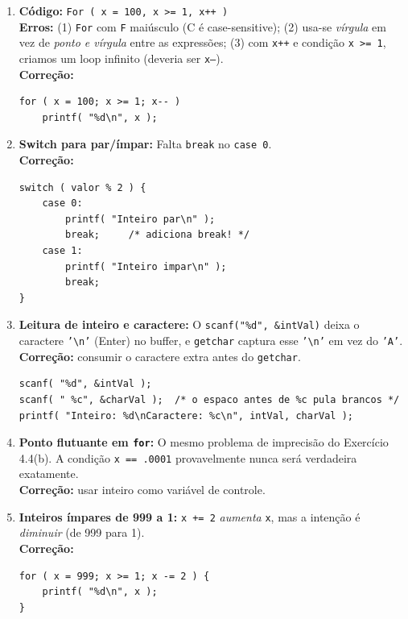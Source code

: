 \documentclass[12pt,a4paper]{article}
\begin{document}
\begin{respostabox}
\begin{enumerate}[label=\textbf{\alph*)}]

\item \textbf{Código:} \texttt{For ( x = 100, x >= 1, x++ )}\\
\textbf{Erros:} (1) \texttt{For} com \texttt{F} maiúsculo (C é case-sensitive);
(2) usa-se \textit{vírgula} em vez de \textit{ponto e vírgula} entre as expressões;
(3) com \texttt{x++} e condição \texttt{x >= 1}, criamos um loop infinito (deveria
ser \texttt{x--}).\\
\textbf{Correção:}
\begin{lstlisting}
for ( x = 100; x >= 1; x-- )
    printf( "%d\n", x );
\end{lstlisting}

\item \textbf{Switch para par/ímpar:} Falta \texttt{break} no \texttt{case 0}.\\
\textbf{Correção:}
\begin{lstlisting}
switch ( valor % 2 ) {
    case 0:
        printf( "Inteiro par\n" );
        break;     /* adiciona break! */
    case 1:
        printf( "Inteiro impar\n" );
        break;
}
\end{lstlisting}

\item \textbf{Leitura de inteiro e caractere:} O \texttt{scanf("\%d", \&intVal)} deixa
o caractere \texttt{'\textbackslash n'} (Enter) no buffer, e \texttt{getchar} captura
esse \texttt{'\textbackslash n'} em vez do \texttt{'A'}.\\
\textbf{Correção:} consumir o caractere extra antes do \texttt{getchar}.
\begin{lstlisting}
scanf( "%d", &intVal );
scanf( " %c", &charVal );  /* o espaco antes de %c pula brancos */
printf( "Inteiro: %d\nCaractere: %c\n", intVal, charVal );
\end{lstlisting}

\item \textbf{Ponto flutuante em \texttt{for}:} O mesmo problema de imprecisão do
Exercício 4.4(b). A condição \texttt{x == .0001} provavelmente nunca será
verdadeira exatamente.\\
\textbf{Correção:} usar inteiro como variável de controle.

\item \textbf{Inteiros ímpares de 999 a 1:} \texttt{x += 2} \textit{aumenta} \texttt{x},
mas a intenção é \textit{diminuir} (de 999 para 1).\\
\textbf{Correção:}
\begin{lstlisting}
for ( x = 999; x >= 1; x -= 2 ) {
    printf( "%d\n", x );
}
\end{lstlisting}


\end{enumerate}
\end{respostabox}
\end{document}
